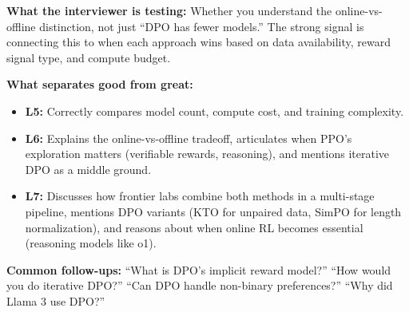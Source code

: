 \begin{interviewq}
\textbf{What the interviewer is testing:} Whether you understand the online-vs-offline distinction, not just ``DPO has fewer models.'' The strong signal is connecting this to when each approach wins based on data availability, reward signal type, and compute budget.

\textbf{What separates good from great:}
\begin{itemize}
    \item \textbf{L5:} Correctly compares model count, compute cost, and training complexity.
    \item \textbf{L6:} Explains the online-vs-offline tradeoff, articulates when PPO's exploration matters (verifiable rewards, reasoning), and mentions iterative DPO as a middle ground.
    \item \textbf{L7:} Discusses how frontier labs combine both methods in a multi-stage pipeline, mentions DPO variants (KTO for unpaired data, SimPO for length normalization), and reasons about when online RL becomes essential (reasoning models like o1).
\end{itemize}

\textbf{Common follow-ups:} ``What is DPO's implicit reward model?'' ``How would you do iterative DPO?'' ``Can DPO handle non-binary preferences?'' ``Why did Llama 3 use DPO?''
\end{interviewq}



